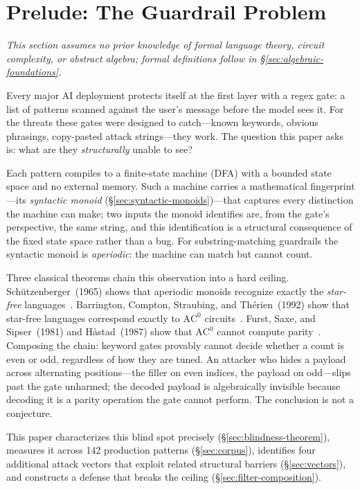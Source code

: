 \documentclass[letterpaper,twocolumn,10pt]{article}
\theoremstyle{definition}
\theoremstyle{remark}
\begin{document}
\section{Prelude: The Guardrail Problem}\label{sec:prelude}

\emph{This section assumes no prior knowledge of formal language theory,
circuit complexity, or abstract algebra; formal definitions follow in
\S\ref{sec:algebraic-foundations}.}

Every major AI deployment protects itself at the first layer with a regex
gate: a list of patterns scanned against the user's message before the model
sees it.
For the threats these gates were designed to catch---known keywords, obvious
phrasings, copy-pasted attack strings---they work.
The question this paper asks is: what are they \emph{structurally} unable to
see?

Each pattern compiles to a finite-state machine (DFA) with a bounded state
space and no external memory.
Such a machine carries a mathematical fingerprint---its \emph{syntactic monoid}
(\S\ref{sec:syntactic-monoids})---that captures every distinction the machine
can make; two inputs the monoid identifies are, from the gate's perspective,
the same string, and this identification is a structural consequence of the
fixed state space rather than a bug.
For substring-matching guardrails the syntactic monoid is \emph{aperiodic}:
the machine can match but cannot count.

Three classical theorems chain this observation into a hard ceiling.
Sch\"{u}tzenberger~(1965) shows that aperiodic monoids recognize exactly the
\emph{star-free} languages~\cite{schutzenberger1965}.
Barrington, Compton, Straubing, and Th\'{e}rien~(1992) show that star-free
languages correspond exactly to $\mathrm{AC}^0$
circuits~\cite{barrington1992}.
Furst, Saxe, and Sipser~(1981) and H\aa{}stad~(1987) show that $\mathrm{AC}^0$
cannot compute parity~\cite{furst1981,hastad1987}.
Composing the chain: keyword gates provably cannot decide whether a count is
even or odd, regardless of how they are tuned.
An attacker who hides a payload across alternating positions---the filler
on even indices, the payload on odd---slips past the gate unharmed; the
decoded payload is algebraically invisible because decoding it is a parity
operation the gate cannot perform.
The conclusion is not a conjecture.

This paper characterizes this blind spot precisely
(\S\ref{sec:blindness-theorem}), measures it across 142 production patterns
(\S\ref{sec:corpus}), identifies four additional attack vectors that exploit
related structural barriers (\S\ref{sec:vectors}), and constructs a defense
that breaks the ceiling (\S\ref{sec:filter-composition}).
\end{document}
